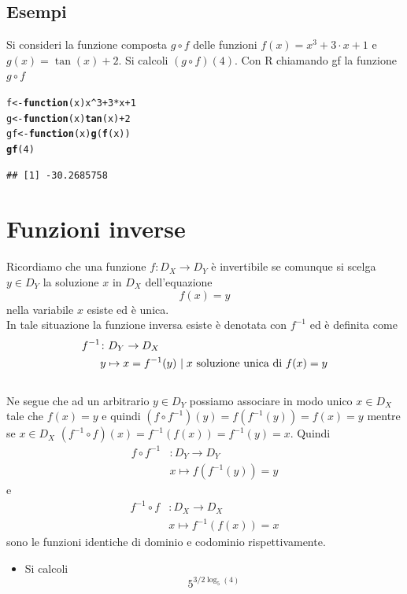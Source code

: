\documentclass[onecolumn,11pt]{book}\usepackage[]{graphicx}\usepackage[]{color}
\makeatletter
\newcommand{\hlnum}[1]{\textcolor[rgb]{0.686,0.059,0.569}{#1}}%
\newcommand{\hlopt}[1]{\textcolor[rgb]{0,0,0}{#1}}%
\newcommand{\hlstd}[1]{\textcolor[rgb]{0.345,0.345,0.345}{#1}}%
\newcommand{\hlkwa}[1]{\textcolor[rgb]{0.161,0.373,0.58}{\textbf{#1}}}%
\newcommand{\hlkwb}[1]{\textcolor[rgb]{0.69,0.353,0.396}{#1}}%
\newcommand{\hlkwc}[1]{\textcolor[rgb]{0.333,0.667,0.333}{#1}}%
\newcommand{\hlkwd}[1]{\textcolor[rgb]{0.737,0.353,0.396}{\textbf{#1}}}%
\newenvironment{kframe}{%
 \def\at@end@of@kframe{}%
 \ifinner\ifhmode%
  \def\at@end@of@kframe{\end{minipage}}%
  \begin{minipage}{\columnwidth}%
 \fi\fi%
 \def\FrameCommand##1{\hskip\@totalleftmargin \hskip-\fboxsep
 \colorbox{shadecolor}{##1}\hskip-\fboxsep
     \hskip-\linewidth \hskip-\@totalleftmargin \hskip\columnwidth}%
 \MakeFramed {\advance\hsize-\width
   \@totalleftmargin\z@ \linewidth\hsize
   \@setminipage}}%
 {\par\unskip\endMakeFramed%
 \at@end@of@kframe}
\newenvironment{knitrout}{}{} %
\makeatother
\begin{document}
\subsection{Esempi}
Si consideri la funzione composta $g\circ f$ delle funzioni $f(x)=x^3+3 \cdot x+1$ e $g(x)=\tan(x)+2$.
Si calcoli $(g\circ f)(4)$. Con R chiamando gf la funzione $g\circ f$
\begin{knitrout}
\color{fgcolor}\begin{kframe}
\begin{alltt}
\hlstd{f}\hlkwb{<-}\hlkwa{function}\hlstd{(}\hlkwc{x}\hlstd{) x}\hlopt{^}\hlnum{3}\hlopt{+}\hlnum{3}\hlopt{*}\hlstd{x}\hlopt{+}\hlnum{1}
\hlstd{g}\hlkwb{<-}\hlkwa{function} \hlstd{(}\hlkwc{x}\hlstd{)}  \hlkwd{tan}\hlstd{(x)}\hlopt{+}\hlnum{2}
\hlstd{gf}\hlkwb{<-}\hlkwa{function}\hlstd{(}\hlkwc{x}\hlstd{)} \hlkwd{g}\hlstd{(}\hlkwd{f}\hlstd{(x))}
\hlkwd{gf}\hlstd{(}\hlnum{4}\hlstd{)}
\end{alltt}
\begin{verbatim}
## [1] -30.2685758
\end{verbatim}
\end{kframe}
\end{knitrout}
\section{Funzioni inverse}
Ricordiamo che una funzione $f\colon D_X\rightarrow D_Y$
\`e invertibile se comunque si scelga $y\in D_Y$ la soluzione $x$ in $D_X$ dell'equazione
\[f(x)=y \]
nella variabile $x$ esiste ed \`e unica.
\\
In tale situazione la funzione inversa esiste \`e denotata con $f^{-1}$ ed  \`e definita come
\begin{align*}     f^{-1}&\colon D_Y\rightarrow D_X
\\
&y\mapsto x=f^{-1}(y) \hbox{ $\mid x$ soluzione unica di } f(x)=y\end{align*}
\\
Ne segue che ad un arbitrario $y\in D_Y$  possiamo associare in modo unico $x\in D_X$ tale che $f(x)=y$  e quindi
$(f\circ f^{-1})(y)=f(f^{-1}(y))=f(x)=y$  mentre se $x \in D_X$ $(f^{-1}\circ f)(x)= f^{-1}(f(x))=f^{-1}(y)=x$.  Quindi
\begin{align}  f\circ f^{-1}&\colon D_Y\rightarrow D_Y
\\
&x\mapsto f(f^{-1}(y))=y\end{align}
 e
\begin{align*} f^{-1} \circ f&\colon D_X\rightarrow D_X
\\
&x\mapsto f^{-1}(f(x))=x\end{align*}
sono le funzioni identiche di dominio e codominio rispettivamente.
\begin{itemize}
\item Si calcoli
\[5^{3/2 \log_{5}(4)}\]
\end{itemize}
\end{document}
